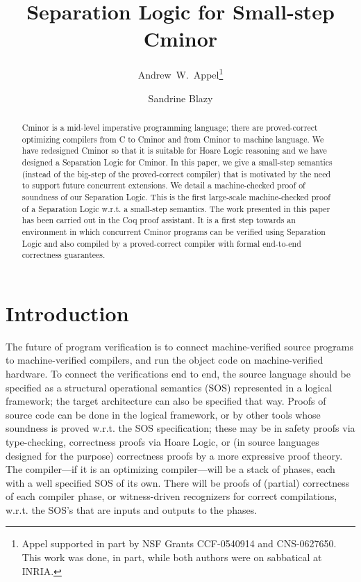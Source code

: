 \documentclass{llncs}
\newcommand{\cminor}{Cminor}
\begin{document}
\author{
Andrew~W.~Appel\fnmsep{}\thanks{Appel supported in part by NSF Grants CCF-0540914 and CNS-0627650.
This work was done, in part, while both authors were on sabbatical at INRIA.}
  \and
Sandrine Blazy\fnmsep{}
}

\title{Separation Logic for Small-step \cminor}

\maketitle 

\pagestyle{plain}

\vspace{-20pt}
\begin{abstract}
\cminor{} is a mid-level imperative programming language;
there are proved-correct optimizing compilers
from C to \cminor{} and from \cminor{} to machine language.
We have redesigned \cminor{} so that it is suitable for Hoare Logic
reasoning and we have designed a Separation Logic for \cminor.
In this paper, we give a small-step semantics (instead of the big-step of
the proved-correct compiler) 
that is motivated by the need to support future concurrent extensions.
We detail a machine-checked proof of soundness of our Separation Logic.
This is the first large-scale machine-checked 
proof of a Separation Logic w.r.t. a small-step semantics.
The work presented in this paper has been carried out in the Coq proof assistant. 
It is a first step towards an
environment in which concurrent \cminor{} programs 
can be verified using Separation Logic
and also
compiled by a proved-correct compiler with formal
end-to-end correctness guarantees.
\end{abstract}

\section{Introduction}

The future of program
verification is to connect machine-verified source programs to
machine-verified compilers, and run the object code on 
machine-verified hardware.  To connect the verifications end to end,
the source language should be specified as a structural operational semantics
(SOS) represented
in a logical framework; the target architecture can also be specified
that way.  Proofs of source code can be done in the logical framework,
or by other tools whose soundness is proved w.r.t. the SOS
specification; 
these may be in safety proofs via type-checking,
correctness proofs via Hoare Logic,
or (in source languages designed for the purpose) 
correctness proofs by a more expressive proof theory.
The compiler---if it
is an optimizing compiler---will be a stack of
phases, each with a well specified SOS of its own.  There
will be proofs of (partial) correctness of each compiler phase, or
witness-driven recognizers for correct compilations, w.r.t.
the SOS's that are inputs and outputs to the phases.
\end{document}
